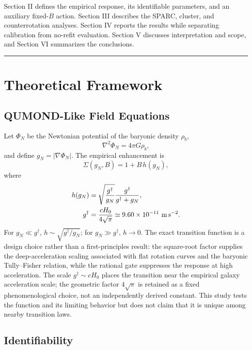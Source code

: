 \documentclass[aps,prd,reprint,superscriptaddress,showpacs,floatfix,longbibliography]{revtex4-2}
\begin{document}
Section II defines the empirical response, its identifiable parameters, and an auxiliary fixed-$B$ action. Section III describes the SPARC, cluster, and counterrotation analyses. Section IV reports the results while separating calibration from no-refit evaluation. Section V discusses interpretation and scope, and Section VI summarizes the conclusions.

\medskip\hrule\medskip

\section{Theoretical Framework}

\subsection{QUMOND-Like Field Equations}

Let $\Phi_N$ be the Newtonian potential of the baryonic density $\rho_b$,
\begin{equation}
\nabla^2\Phi_N=4\pi G\rho_b,
\label{eq:poissonN}
\end{equation}
and define $g_N=|\nabla\Phi_N|$. The empirical enhancement is
\begin{equation}
\Sigma(g_N,B)=1+B\,h(g_N),
\label{eq:sigma}
\end{equation}
where
\begin{equation}
\begin{aligned}
h(g_N)&=\sqrt{\frac{g^\dagger}{g_N}}
\frac{g^\dagger}{g^\dagger+g_N},\\
g^\dagger&=\frac{cH_0}{4\sqrt{\pi}}
\simeq9.60\times10^{-11}\ {\rm m\,s^{-2}} .
\end{aligned}
\label{eq:h}
\end{equation}
For $g_N\ll g^\dagger$, $h\sim\sqrt{g^\dagger/g_N}$; for $g_N\gg g^\dagger$, $h\rightarrow0$. The exact transition function is a design choice rather than a first-principles result: the square-root factor supplies the deep-acceleration scaling associated with flat rotation curves and the baryonic Tully--Fisher relation, while the rational gate suppresses the response at high acceleration. The scale $g^\dagger\sim cH_0$ places the transition near the empirical galaxy acceleration scale; the geometric factor $4\sqrt{\pi}$ is retained as a fixed phenomenological choice, not an independently derived constant. This study tests the function and its limiting behavior but does not claim that it is unique among nearby transition laws.

\subsection{Identifiability}
\end{document}

